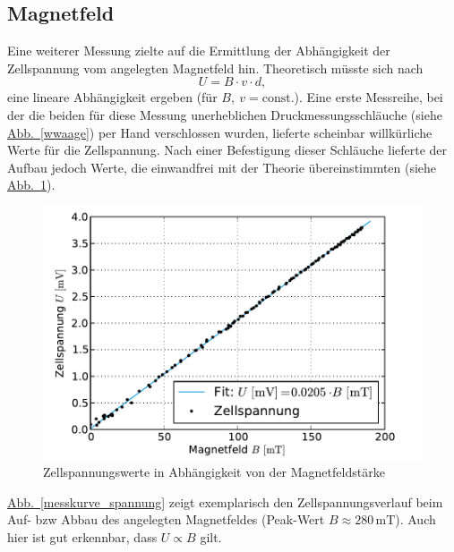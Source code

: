 \documentclass[11pt]{scrartcl}
\newcommand{\unit}[1]{\ensuremath{\,\mathrm{#1}}} %
\newcommand{\abb}[1]{\hyperref[#1]{Abb.~\ref{#1}}}
\begin{document}
\subsection{Magnetfeld}		 	%
Eine weiterer Messung zielte auf die Ermittlung der Abhängigkeit der Zellspannung vom angelegten Magnetfeld hin. Theoretisch müsste sich nach
\begin{equation}
U = B \cdot v \cdot d,
\end{equation}
eine lineare Abhängigkeit ergeben (für $B,\ v=\text{const.}$). Eine erste Messreihe, bei der die beiden für diese Messung unerheblichen Druckmessungsschläuche (siehe \abb{wwaage}) per Hand verschlossen wurden, lieferte scheinbar willkürliche Werte für die Zellspannung. Nach einer Befestigung dieser Schläuche lieferte der Aufbau jedoch Werte, die einwandfrei mit der Theorie übereinstimmten (siehe \abb{spannung}).

\begin{figure}[ht]
\begin{center}
\includegraphics[width=1.0\textwidth]{images/spannung.pdf}
\end{center}
\vspace{-1.5\baselineskip}
\caption{Zellspannungswerte in Abhängigkeit von der Magnetfeldstärke}
\label{spannung}
\end{figure}

\abb{messkurve_spannung} zeigt exemplarisch den Zellspannungsverlauf beim Auf- bzw Abbau des angelegten Magnetfeldes (Peak-Wert $B \approx 280 \unit{mT}$). Auch hier ist gut erkennbar, dass $U \propto B$ gilt.
\end{document}
